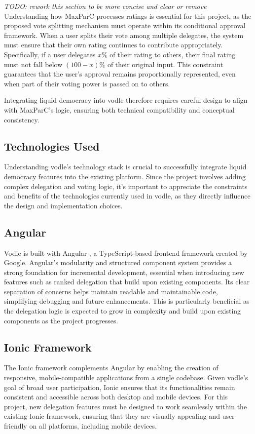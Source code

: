 \textit{TODO: rework this section to be more concise and clear or remove}
Understanding how MaxParC processes ratings is essential for this project, as the proposed vote splitting mechanism must operate within its conditional approval framework. When a user splits their vote among multiple delegates, the system must ensure that their own rating continues to contribute appropriately. Specifically, if a user delegates $x\%$ of their rating to others, their final rating must not fall below $(100-x)\%$ of their original input. This constraint guarantees that the user's approval remains proportionally represented, even when part of their voting power is passed on to others.

Integrating liquid democracy into vodle therefore requires careful design to align with MaxParC's logic, ensuring both technical compatibility and conceptual consistency.

\subsection{Technologies Used}
Understanding vodle's technology stack is crucial to successfully integrate liquid democracy features into the existing platform. Since the project involves adding complex delegation and voting logic, it's important to appreciate the constraints and benefits of the technologies currently used in vodle, as they directly influence the design and implementation choices.

\subsection*{Angular}
Vodle is built with Angular \citep{angular}, a TypeScript-based frontend framework created by Google. Angular's modularity and structured component system provides a strong foundation for incremental development, essential when introducing new features such as ranked delegation that build upon existing components. Its clear separation of concerns helps maintain readable and maintainable code, simplifying debugging and future enhancements. This is particularly beneficial as the delegation logic is expected to grow in complexity and build upon existing components as the project progresses.

\subsection*{Ionic Framework}
The Ionic \citep{ionic} framework complements Angular by enabling the creation of responsive, mobile-compatible applications from a single codebase. Given vodle's goal of broad user participation, Ionic ensures that its functionalities remain consistent and accessible across both desktop and mobile devices. %
For this project, new delegation features must be designed to work seamlessly within the existing Ionic framework, ensuring that they are visually appealing and user-friendly on all platforms, including mobile devices.

